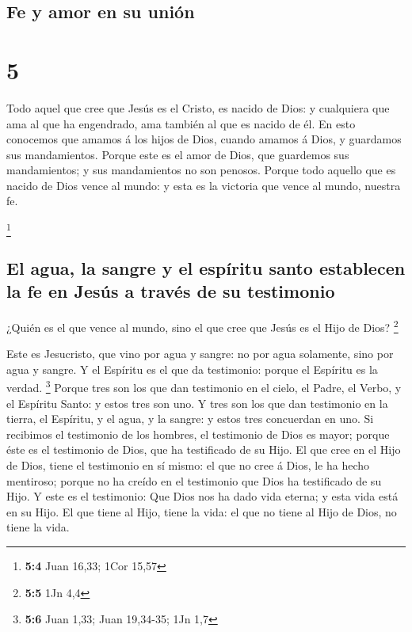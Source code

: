 \hypertarget{fe-y-amor-en-su-uniuxf3n}{%
\subsection{Fe y amor en su unión}\label{fe-y-amor-en-su-uniuxf3n}}

\hypertarget{section-4}{%
\section{5}\label{section-4}}

 Todo aquel que cree que Jesús es el Cristo, es nacido de
Dios: y cualquiera que ama al que ha engendrado, ama también al que es
nacido de él.  En esto conocemos que amamos á los hijos de
Dios, cuando amamos á Dios, y guardamos sus mandamientos. 
Porque este es el amor de Dios, que guardemos sus mandamientos; y sus
mandamientos no son penosos.  Porque todo aquello que es
nacido de Dios vence al mundo: y esta es la victoria que vence al mundo,
nuestra fe.

\footnote{\textbf{5:4} Juan 16,33; 1Cor 15,57}

\hypertarget{el-agua-la-sangre-y-el-espuxedritu-santo-establecen-la-fe-en-jesuxfas-a-travuxe9s-de-su-testimonio}{%
\subsection{El agua, la sangre y el espíritu santo establecen la fe en
Jesús a través de su
testimonio}\label{el-agua-la-sangre-y-el-espuxedritu-santo-establecen-la-fe-en-jesuxfas-a-travuxe9s-de-su-testimonio}}

 ¿Quién es el que vence al mundo, sino el que cree que
Jesús es el Hijo de Dios? \footnote{\textbf{5:5} 1Jn 4,4}

 Este es Jesucristo, que vino por agua y sangre: no por
agua solamente, sino por agua y sangre. Y el Espíritu es el que da
testimonio: porque el Espíritu es la verdad. \footnote{\textbf{5:6} Juan
  1,33; Juan 19,34-35; 1Jn 1,7}  Porque tres son los que
dan testimonio en el cielo, el Padre, el Verbo, y el Espíritu Santo: y
estos tres son uno.  Y tres son los que dan testimonio en
la tierra, el Espíritu, y el agua, y la sangre: y estos tres concuerdan
en uno.  Si recibimos el testimonio de los hombres, el
testimonio de Dios es mayor; porque éste es el testimonio de Dios, que
ha testificado de su Hijo.  El que cree en el Hijo de
Dios, tiene el testimonio en sí mismo: el que no cree á Dios, le ha
hecho mentiroso; porque no ha creído en el testimonio que Dios ha
testificado de su Hijo.  Y este es el testimonio: Que
Dios nos ha dado vida eterna; y esta vida está en su Hijo.
 El que tiene al Hijo, tiene la vida: el que no tiene al
Hijo de Dios, no tiene la vida.

